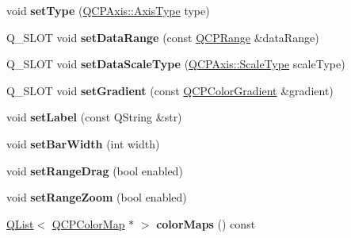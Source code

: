 \begin{DoxyCompactItemize}
\item 
void {\bfseries set\+Type} (\hyperlink{class_q_c_p_axis_ae2bcc1728b382f10f064612b368bc18a}{Q\+C\+P\+Axis\+::\+Axis\+Type} type)\hypertarget{class_q_c_p_color_scale_a1bf9bdb291927c422dd66b404b206f1f}{}\label{class_q_c_p_color_scale_a1bf9bdb291927c422dd66b404b206f1f}

\item 
Q\+\_\+\+S\+L\+OT void {\bfseries set\+Data\+Range} (const \hyperlink{class_q_c_p_range}{Q\+C\+P\+Range} \&data\+Range)\hypertarget{class_q_c_p_color_scale_abb46cf71d84dc5b7d03323357442d2dd}{}\label{class_q_c_p_color_scale_abb46cf71d84dc5b7d03323357442d2dd}

\item 
Q\+\_\+\+S\+L\+OT void {\bfseries set\+Data\+Scale\+Type} (\hyperlink{class_q_c_p_axis_a36d8e8658dbaa179bf2aeb973db2d6f0}{Q\+C\+P\+Axis\+::\+Scale\+Type} scale\+Type)\hypertarget{class_q_c_p_color_scale_a93fe7596edc87301608e769d0646a619}{}\label{class_q_c_p_color_scale_a93fe7596edc87301608e769d0646a619}

\item 
Q\+\_\+\+S\+L\+OT void {\bfseries set\+Gradient} (const \hyperlink{class_q_c_p_color_gradient}{Q\+C\+P\+Color\+Gradient} \&gradient)\hypertarget{class_q_c_p_color_scale_a4b08e17b5f5726b26d101df7aa2ee182}{}\label{class_q_c_p_color_scale_a4b08e17b5f5726b26d101df7aa2ee182}

\item 
void {\bfseries set\+Label} (const Q\+String \&str)\hypertarget{class_q_c_p_color_scale_aee124ae8396320cacf8276e9a0fbb8ce}{}\label{class_q_c_p_color_scale_aee124ae8396320cacf8276e9a0fbb8ce}

\item 
void {\bfseries set\+Bar\+Width} (int width)\hypertarget{class_q_c_p_color_scale_ab9dcc0c1cd583477496209b1413bcb99}{}\label{class_q_c_p_color_scale_ab9dcc0c1cd583477496209b1413bcb99}

\item 
void {\bfseries set\+Range\+Drag} (bool enabled)\hypertarget{class_q_c_p_color_scale_a21c51a55e4fd581b6feadca9ee5b38d5}{}\label{class_q_c_p_color_scale_a21c51a55e4fd581b6feadca9ee5b38d5}

\item 
void {\bfseries set\+Range\+Zoom} (bool enabled)\hypertarget{class_q_c_p_color_scale_a96bd60fb6317ad6821841b539c93eeeb}{}\label{class_q_c_p_color_scale_a96bd60fb6317ad6821841b539c93eeeb}

\item 
\hyperlink{class_q_list}{Q\+List}$<$ \hyperlink{class_q_c_p_color_map}{Q\+C\+P\+Color\+Map} $\ast$ $>$ {\bfseries color\+Maps} () const \hypertarget{class_q_c_p_color_scale_a31b654f4d719d5355821ecc2e12334f0}{}\label{class_q_c_p_color_scale_a31b654f4d719d5355821ecc2e12334f0}


\end{DoxyCompactItemize}
